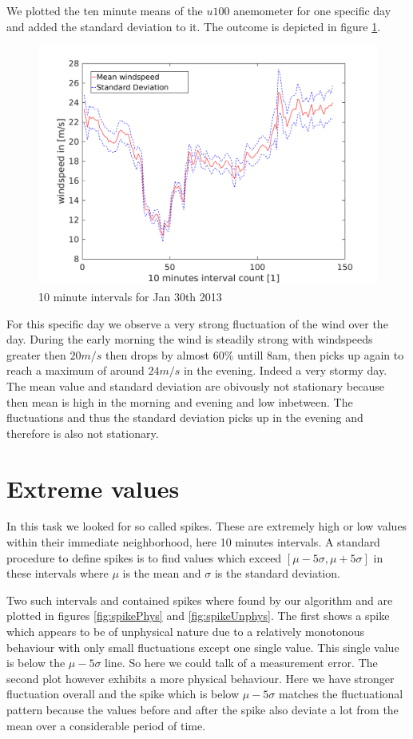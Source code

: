 \documentclass[10pt]{article}
\begin{document}
We plotted the ten minute means of the $u100$ anemometer for one specific day and added the standard deviation to it. The outcome is depicted in figure \ref{fig:means}.
\begin{figure}[htb!]
  \centering
  \includegraphics[width=1\linewidth]{../Plots/mean_interval_withstd.png}
  \caption{10 minute intervals for Jan 30th 2013}
  \label{fig:means}
\end{figure}

For this specific day we observe a very strong fluctuation of the wind over the day. During the early morning the wind is steadily strong with windspeeds greater then $20 m/s$ then drops by almost $60 \%$ untill 8am, then picks up again to reach a maximum of around $24 m/s$ in the evening. Indeed a very stormy day. The mean value and standard deviation are obivously not stationary because then mean is high in the morning and evening and low inbetween. The fluctuations and thus the standard deviation picks up in the evening and therefore is also not stationary.

\section{Extreme values}
In this task we looked for so called spikes. These are extremely high or low values within their immediate neighborhood, here 10 minutes intervals. A standard procedure to define spikes is to find values which exceed $[\mu - 5\sigma , \mu+5\sigma]$ in these intervals where $\mu$ is the mean and $\sigma$ is the standard deviation. 

Two such intervals and contained spikes where found by our algorithm and are plotted in figures \ref{fig:spikePhys} and \ref{fig:spikeUnphys}. The first shows a spike which appears to be of unphysical nature due to a relatively monotonous behaviour with only small fluctuations except one single value. This single value is below the $\mu-5\sigma$ line. So here we could talk of a measurement error. The second plot however exhibits a more physical behaviour. Here we have stronger fluctuation overall and the spike which is below $\mu-5\sigma$ matches the fluctuational pattern because the values before and after the spike also deviate a lot from the mean over a considerable period of time.
\end{document}
